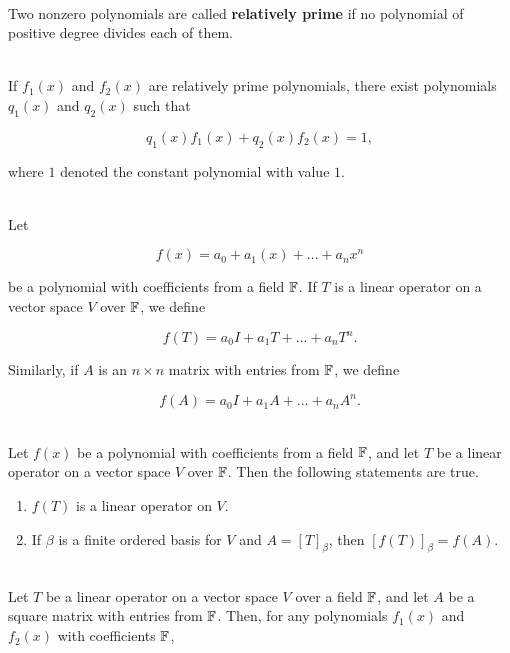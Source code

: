 \begin{alphasection}
	\begin{definition}
		\hfill\\
		Two nonzero polynomials are called \textbf{relatively prime} if no polynomial of positive degree divides each of them.
	\end{definition}

	\begin{theorem}
		\hfill\\
		If $f_1(x)$ and $f_2(x)$ are relatively prime polynomials, there exist polynomials $q_1(x)$ and $q_2(x)$ such that

		\[q_1(x)f_1(x) + q_2(x)f_2(x) = 1,\]

		where $1$ denoted the constant polynomial with value $1$.
	\end{theorem}

	\begin{definition}
		\hfill\\
		Let

		\[f(x) = a_0 + a_1(x) + \dots + a_nx^n\]

		be a polynomial with coefficients from a field $\mathbb{F}$. If $T$ is a linear operator on a vector space $V$ over $\mathbb{F}$, we define

		\[f(T) = a_0I + a_1T + \dots + a_nT^n.\]

		Similarly, if $A$ is an $n \times n$ matrix with entries from $\mathbb{F}$, we define

		\[f(A) = a_0I+ a_1A + \dots + a_nA^n.\]
	\end{definition}

	\begin{theorem}
		\hfill\\
		Let $f(x)$ be a polynomial with coefficients from a field $\mathbb{F}$, and let $T$ be a linear operator on a vector space $V$ over $\mathbb{F}$. Then the following statements are true.

		\begin{enumerate}
			\item $f(T)$ is a linear operator on $V$.
			\item If $\beta$ is a finite ordered basis for $V$ and $A=[T]_\beta$, then $[f(T)]_\beta = f(A)$.
		\end{enumerate}
	\end{theorem}

	\begin{theorem}
		\hfill\\
		Let $T$ be a linear operator on a vector space $V$ over a field $\mathbb{F}$, and let $A$ be a square matrix with entries from $\mathbb{F}$. Then, for any polynomials $f_1(x)$ and $f_2(x)$ with coefficients $\mathbb{F}$,


\end{theorem}
\end{alphasection}
